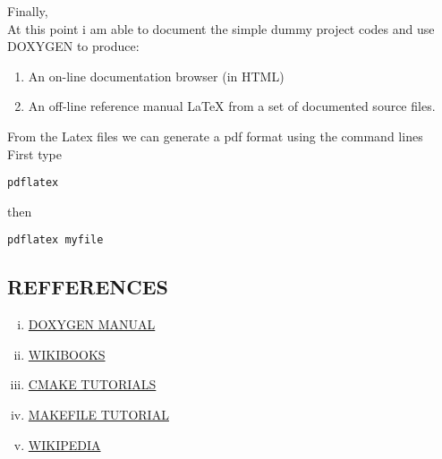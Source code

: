 \documentclass[11pt,utf8]{article}
\begin{document}
Finally,\\
 At this point i am able to document the simple dummy project codes and use DOXYGEN to produce:\\
\begin{enumerate}
\item An on-line documentation browser (in HTML)
\item An off-line reference manual LaTeX from a set of documented source files.
\end{enumerate}
From the Latex files we can generate a pdf format  using the command lines\\
First type  
\begin{lstlisting}
pdflatex 
\end{lstlisting}
 then  
\begin{lstlisting}
pdflatex myfile 
\end{lstlisting}

 \subsection{REFFERENCES}
\label{sec: refferences}

\begin{enumerate}[i.]
  \item  \href{http://www.stack.nl/~dimitri/doxygen/manual/docblocks.html}{DOXYGEN MANUAL}
  \item  \href{https://fr.wikibooks.org/wiki/Programmation_C%2B%2B/Les_classes#Exemples_de_classes}{WIKIBOOKS}
  \item  \href{http://www.cmake.org/cmake-tutorial}{CMAKE TUTORIALS}
  \item  \href{http://gl.developpez.com/tutoriel/outil/makefile/}{MAKEFILE TUTORIAL}
  \item  \href{https://en.wikipedia.org/wiki/Doxygen}{WIKIPEDIA}
\end{enumerate}
\end{document}
